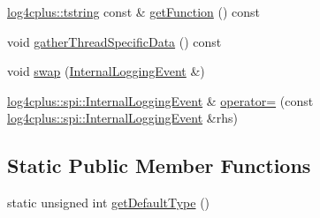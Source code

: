 \begin{DoxyCompactItemize}
\hyperlink{namespacelog4cplus_a3c9287f6ebcddc50355e29d71152117b}{log4cplus\-::tstring} const \& \hyperlink{classlog4cplus_1_1spi_1_1InternalLoggingEvent_a8e05cdf75d536f351d8aa5063113f652}{get\-Function} () const 
\item 
void \hyperlink{classlog4cplus_1_1spi_1_1InternalLoggingEvent_a4a8e6c73d9338d994ec2fa5c13cecb3a}{gather\-Thread\-Specific\-Data} () const 
\item 
void \hyperlink{classlog4cplus_1_1spi_1_1InternalLoggingEvent_a8576bd4ae19760e9a2d881dbef52ba2b}{swap} (\hyperlink{classlog4cplus_1_1spi_1_1InternalLoggingEvent}{Internal\-Logging\-Event} \&)
\item 
\hyperlink{classlog4cplus_1_1spi_1_1InternalLoggingEvent}{log4cplus\-::spi\-::\-Internal\-Logging\-Event} \& \hyperlink{classlog4cplus_1_1spi_1_1InternalLoggingEvent_abe8056ae0b3049e0295e1fd23c61ae71}{operator=} (const \hyperlink{classlog4cplus_1_1spi_1_1InternalLoggingEvent}{log4cplus\-::spi\-::\-Internal\-Logging\-Event} \&rhs)
\end{DoxyCompactItemize}
\subsection*{Static Public Member Functions}
\begin{DoxyCompactItemize}
\item 
static unsigned int \hyperlink{classlog4cplus_1_1spi_1_1InternalLoggingEvent_affbca6874d2574252e9432ec9c206b4b}{get\-Default\-Type} ()
\end{DoxyCompactItemize}

